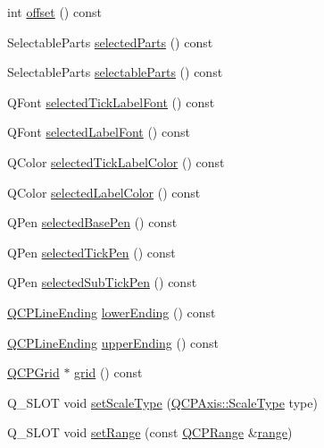 \begin{DoxyCompactItemize}
\item 
int \hyperlink{class_q_c_p_axis_aef66fa16353b4993b1cceabfb644a1a9}{offset} () const
\item 
Selectable\+Parts \hyperlink{class_q_c_p_axis_a893e8d6cfed9267eb2b793cb1d2b4dce}{selected\+Parts} () const
\item 
Selectable\+Parts \hyperlink{class_q_c_p_axis_a1d12d157756c114f4e57517c62177181}{selectable\+Parts} () const
\item 
Q\+Font \hyperlink{class_q_c_p_axis_a09817512bef8ddfb669a6828f9c855bc}{selected\+Tick\+Label\+Font} () const
\item 
Q\+Font \hyperlink{class_q_c_p_axis_a1399d614f7c307159bfec938a069203d}{selected\+Label\+Font} () const
\item 
Q\+Color \hyperlink{class_q_c_p_axis_a75f11d3031a11559f3e984e916fcde2c}{selected\+Tick\+Label\+Color} () const
\item 
Q\+Color \hyperlink{class_q_c_p_axis_a7adea64ef4b715e7a1c519fff2b110b8}{selected\+Label\+Color} () const
\item 
Q\+Pen \hyperlink{class_q_c_p_axis_a0d54314ab3053fd0fb77294a0e7f08cb}{selected\+Base\+Pen} () const
\item 
Q\+Pen \hyperlink{class_q_c_p_axis_a76b52a6d824ccf9a95eb024251e1b833}{selected\+Tick\+Pen} () const
\item 
Q\+Pen \hyperlink{class_q_c_p_axis_a73c147bb2c5598edbb842adc2da8a7bf}{selected\+Sub\+Tick\+Pen} () const
\item 
\hyperlink{class_q_c_p_line_ending}{Q\+C\+P\+Line\+Ending} \hyperlink{class_q_c_p_axis_a0cc60e5694ed4df6a2c3554e53ee6ae7}{lower\+Ending} () const
\item 
\hyperlink{class_q_c_p_line_ending}{Q\+C\+P\+Line\+Ending} \hyperlink{class_q_c_p_axis_a9feaf5f78286693e89221bc205f9389a}{upper\+Ending} () const
\item 
\hyperlink{class_q_c_p_grid}{Q\+C\+P\+Grid} $\ast$ \hyperlink{class_q_c_p_axis_a63f1dd2df663680d2a8d06c19592dd63}{grid} () const
\item 
Q\+\_\+\+S\+L\+OT void \hyperlink{class_q_c_p_axis_adef29cae617af4f519f6c40d1a866ca6}{set\+Scale\+Type} (\hyperlink{class_q_c_p_axis_a36d8e8658dbaa179bf2aeb973db2d6f0}{Q\+C\+P\+Axis\+::\+Scale\+Type} type)
\item 
Q\+\_\+\+S\+L\+OT void \hyperlink{class_q_c_p_axis_aebdfea5d44c3a0ad2b4700cd4d25b641}{set\+Range} (const \hyperlink{class_q_c_p_range}{Q\+C\+P\+Range} \&\hyperlink{class_q_c_p_axis_ac4058855a81f1a883cf2e754f6a6acb1}{range})
\item 

\end{DoxyCompactItemize}
